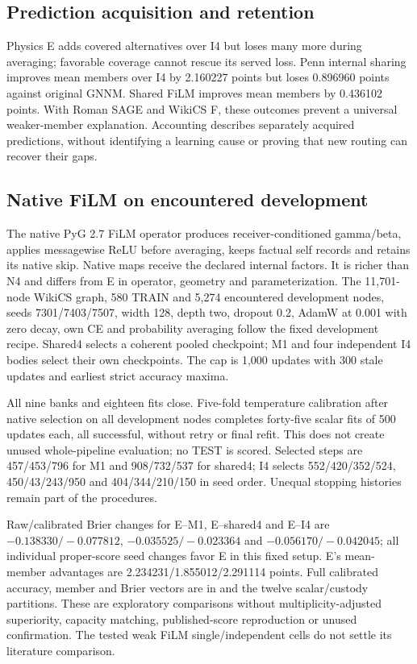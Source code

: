 \subsection{Prediction acquisition and retention}\label{app:retention-v5}

Physics E adds covered alternatives over I4 but loses many more during averaging; favorable coverage cannot rescue its served loss. Penn internal sharing improves mean members over I4 by 2.160227 points but loses 0.896960 points against original GNNM. Shared FiLM improves mean members by 0.436102 points. With Roman SAGE and WikiCS F, these outcomes prevent a universal weaker-member explanation. Accounting describes separately acquired predictions, without identifying a learning cause or proving that new routing can recover their gaps.

\subsection{Native FiLM on encountered development}\label{app:film-v5}
The native PyG 2.7 FiLM operator produces receiver-conditioned gamma/beta, applies messagewise ReLU before averaging, keeps factual self records and retains its native skip. Native maps receive the declared internal factors. It is richer than N4 and differs from E in operator, geometry and parameterization. The 11,701-node WikiCS graph, 580 TRAIN and 5,274 encountered development nodes, seeds 7301/7403/7507, width 128, depth two, dropout 0.2, AdamW at 0.001 with zero decay, own CE and probability averaging follow the fixed development recipe. Shared4 selects a coherent pooled checkpoint; M1 and four independent I4 bodies select their own checkpoints. The cap is 1,000 updates with 300 stale updates and earliest strict accuracy maxima.

All nine banks and eighteen fits close. Five-fold temperature calibration after native selection on all development nodes completes forty-five scalar fits of 500 updates each, all successful, without retry or final refit. This does not create unused whole-pipeline evaluation; no TEST is scored. Selected steps are 457/453/796 for M1 and 908/732/537 for shared4; I4 selects 552/420/352/524, 450/43/243/950 and 404/344/210/150 in seed order. Unequal stopping histories remain part of the procedures.




Raw/calibrated Brier changes for E--M1, E--shared4 and E--I4 are $-0.138330/-0.077812$, $-0.035525/-0.023364$ and $-0.056170/-0.042045$; all individual proper-score seed changes favor E in this fixed setup. E's mean-member advantages are 2.234231/1.855012/2.291114 points. Full calibrated accuracy, member and Brier vectors are in  and the twelve scalar/custody partitions. These are exploratory comparisons without multiplicity-adjusted superiority, capacity matching, published-score reproduction or unused confirmation. The tested weak FiLM single/independent cells do not settle its literature comparison.


